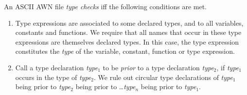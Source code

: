 \documentclass[adraft]{eptcs}
\begin{document}
An ASCII AWN file \emph{type checks} iff the following conditions are met.
\begin{enumerate}
\item Type expressions are associated to some declared types, and to all variables, constants and functions.
  We require that all names that occur in these type expressions are themselves declared types.
  In this case, the type expression constitutes the \emph{type} of the variable, constant, function
  or type expression.
\item
  Call a type declaration \textit{type}$_1$ to be \emph{prior} to a type declaration
  \textit{type}$_2$, if \textit{type}$_1$ occurs in the type of \textit{type}$_2$.
  We rule out circular type declarations of \textit{type}$_1$ being prior to
  \textit{type}$_2$ being prior to \dots \textit{type}$_n$ being prior to \textit{type}$_1$.


\end{enumerate}
\end{document}
